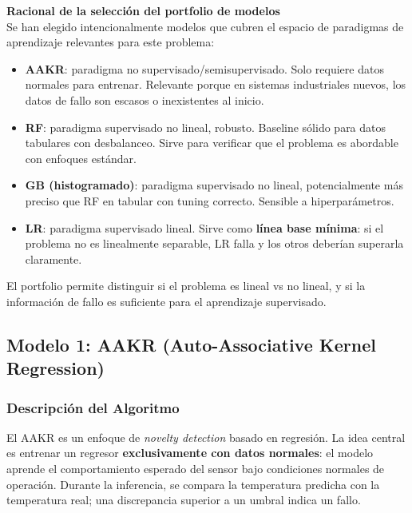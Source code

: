 \documentclass[12pt,a4paper]{article}
\begin{document}
\begin{porquebox}
\textbf{Racional de la selecci\'{o}n del portfolio de modelos}\\[4pt]
Se han elegido intencionalmente modelos que cubren el espacio de paradigmas de
aprendizaje relevantes para este problema:
\begin{itemize}[itemsep=3pt]
  \item \textbf{AAKR}: paradigma no supervisado/semisupervisado. Solo requiere datos
    normales para entrenar. Relevante porque en sistemas industriales nuevos, los
    datos de fallo son escasos o inexistentes al inicio.
  \item \textbf{RF}: paradigma supervisado no lineal, robusto. Baseline s\'{o}lido para
    datos tabulares con desbalanceo. Sirve para verificar que el problema es
    abordable con enfoques est\'{a}ndar.
  \item \textbf{GB (histogramado)}: paradigma supervisado no lineal, potencialmente
    m\'{a}s preciso que RF en tabular con tuning correcto. Sensible a hiperpar\'{a}metros.
  \item \textbf{LR}: paradigma supervisado lineal. Sirve como \textbf{l\'{i}nea base
    m\'{i}nima}: si el problema no es linealmente separable, LR falla y los otros
    deber\'{i}an superarla claramente.
\end{itemize}
El portfolio permite distinguir si el problema es lineal vs no lineal, y si la
informaci\'{o}n de fallo es suficiente para el aprendizaje supervisado.
\end{porquebox}

\subsection{Modelo 1: AAKR (Auto-Associative Kernel Regression)}

\subsubsection{Descripci\'{o}n del Algoritmo}

El AAKR es un enfoque de \textit{novelty detection} basado en regresi\'{o}n. La idea
central es entrenar un regresor \textbf{exclusivamente con datos normales}: el modelo
aprende el comportamiento esperado del sensor bajo condiciones normales de operaci\'{o}n.
Durante la inferencia, se compara la temperatura predicha con la temperatura real;
una discrepancia superior a un umbral indica un fallo.
\end{document}
